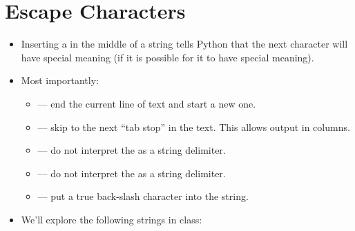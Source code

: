 \documentclass[letterpaper,10pt,english]{sphinxmanual}
\begin{document}
\section{Escape Characters}
\label{\detokenize{lecture_notes/lec03_strings:escape-characters}}\begin{itemize}
\item {} 
Inserting a \sphinxcode{\sphinxupquote{\textbackslash{}}} in the middle of a string tells Python that the
next character will have special meaning (if it is possible for it to
have special meaning).

\item {} 
Most importantly:
\begin{itemize}
\item {} 
 — end the current line of text and start a new one.

\item {} 
 — skip to the next “tab stop” in the text. This allows
output in columns.

\item {} 
 — do not interpret the  as a string delimiter.

\item {} 
 — do not interpret the  as a string delimiter.

\item {} 
\sphinxcode{\sphinxupquote{\textbackslash{}\textbackslash{}}} — put a true back-slash character into the string.

\end{itemize}

\item {} 
We’ll explore the following strings in class:

\begin{sphinxVerbatim}[commandchars=\\\{\}]
  
  
\end{sphinxVerbatim}

\end{itemize}
\end{document}
